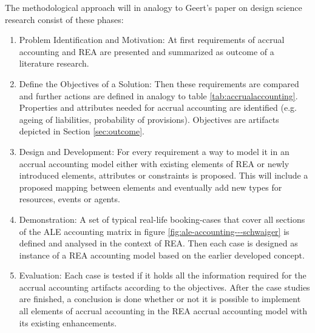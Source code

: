 The methodological approach will in analogy to Geert's paper on design science research \cite{geerts2010designsience} consist of these phases:

\begin{enumerate}
	\item Problem Identification and Motivation: At first requirements of accrual accounting and REA are presented and summarized as outcome of a literature research.
	\item Define the Objectives of a Solution:
	Then these requirements are compared and further actions are defined in analogy to table \ref{tab:accrualaccounting}. Properties and attributes needed for accrual accounting are identified (e.g. ageing of liabilities, probability of provisions).
	Objectives are artifacts depicted in Section \ref{sec:outcome}.
	\item Design and Development: For every requirement a way to model it in an accrual accounting model either with existing elements of REA or newly introduced elements, attributes or constraints is proposed.
	This will include a proposed mapping between elements and eventually add new types for resources, events or agents.
	\item Demonstration: A set of typical real-life booking-cases that cover all sections of the ALE accounting matrix in figure \ref{fig:ale-accounting---schwaiger} is defined and analysed in the context of REA.
	Then each case is designed as instance of a REA accounting model based on the earlier developed concept.
	\item Evaluation: Each case is tested if it holds all the information required for the accrual accounting artifacts according to the objectives.
	After the case studies are finished, a conclusion is done whether or not it is possible to implement all elements of accrual accounting in the REA accrual accounting model with its existing enhancements.
\end{enumerate}

 


